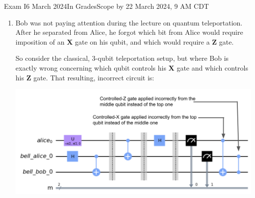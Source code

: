 \documentclass[12pt]{article}
\def\Gate#1{\mbox{\textbf{#1}}}
\def\X{\Gate{X}}
\def\Y{\Gate{Y}}
\def\Z{\Gate{Z}}
\def\H{\Gate{H}}
\newcommand{\Blank}[1][1in]{\mbox{\vrule width #1 depth 2pt}\vrule width 0pt height 2.0em}
\def\BlQb{\mbox{\ensuremath{\Blank[4em]\ket{0}+\Blank[4em]\ket{1}}}}
\begin{document}
\begin{assignment}{Exam I}{6 March 2024}{In GradesScope by 22 March 2024, 9 AM CDT}
\begin{enumerate}
\begin{itemize}
    \item We begin at the North pole of the Bloch sphere.
    \item We are in state \BlQb{}.
    \item We rotate about the \Z{} axis $\pi/4$ radians.  We are now at \BlQb{}.
    \item \vline height 2em width0pt We begin again at the North pole.
    \item We experience a \Y{} gate.  We are now at \BlQb{}.
    \item We then experience a \Z{} gate.  We are now at state \BlQb{}.
    \item We finally experience an \H{} gate.  We are now at state \BlQb{}.
\end{itemize}


\clearpage\item{}
Bob was not paying attention during the lecture on quantum teleportation.  After he separated from Alice, he forgot which bit from Alice would require imposition of an \X{} gate on his qubit, and which would require a \Z{} gate.

So consider the classical, 3-qubit teleportation setup, but where Bob is exactly wrong concerning which qubit controls his \X{} gate and which controls his \Z{} gate.  That resulting, incorrect circuit is:

\includegraphics[scale=0.25]{tportwrong.png}


\end{enumerate}
\end{assignment}
\end{document}
